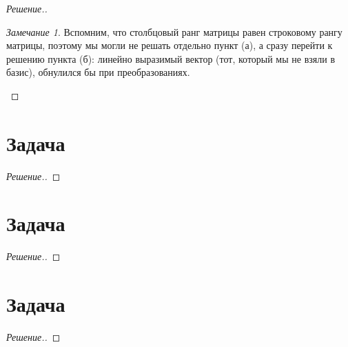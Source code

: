 \documentclass[a4paper]{article}
\theoremstyle{remark}
\newtheorem{remark}{Замечание}
\begin{document}
\begin{proof}[Решение.]
        \begin{remark}
          Вспомним, что столбцовый ранг матрицы равен строковому рангу матрицы, поэтому
          мы могли не решать отдельно пункт (а), а сразу перейти к решению пункта (б): 
          линейно выразимый вектор (тот, который мы не взяли в базис), обнулился бы при
          преобразованиях.
        \end{remark}
      \end{proof}

    \section*{Задача }
	    \begin{proof}[Решение.]
		
        \end{proof}

    \section*{Задача }
	    \begin{proof}[Решение.]
		
        \end{proof}

    \section*{Задача }
	    \begin{proof}[Решение.]
		
        \end{proof}
 	
\end{document}

